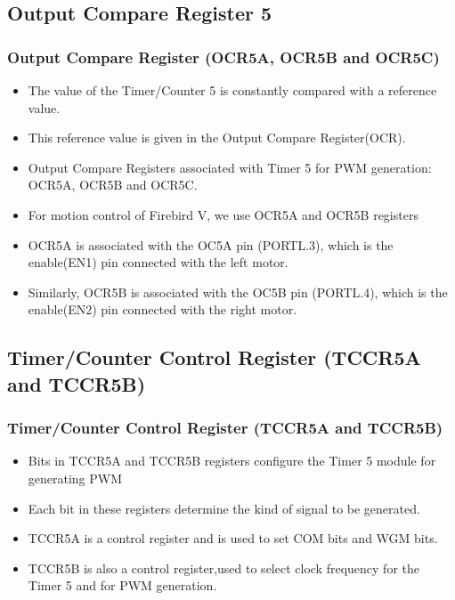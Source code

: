 \documentclass[table,10pt,red]{beamer}	%
\begin{document}
\subsection{Output Compare Register 5} 
\begin{frame}
	\frametitle{Output Compare Register (OCR5A, OCR5B and OCR5C)}
	\begin{itemize}
	  \item <+-|alert@+> The value of the Timer/Counter 5 is constantly compared with a reference value.
	  \item <+-|alert@+> This reference value is given in the Output Compare Register(OCR).
	  \item <+-|alert@+>Output Compare Registers associated with Timer 5 for PWM generation:
	  \pause
	  OCR5A, OCR5B and OCR5C.
	  \pause
	  \item <+-|alert@+> For motion control of Firebird V, we use OCR5A and OCR5B registers
	  \item <+-|alert@+> OCR5A is associated with the OC5A pin (PORTL.3), which is the enable(EN1) pin connected with the left motor.
	  \item <+-|alert@+> Similarly, OCR5B is associated with the OC5B pin (PORTL.4), which is the enable(EN2) pin connected with the right motor.
	 	  
	\end{itemize}
\end{frame}

\subsection{Timer/Counter Control Register (TCCR5A and TCCR5B)} %
\begin{frame}
\frametitle{Timer/Counter Control Register (TCCR5A and TCCR5B)}
\begin{itemize}
  \item <+-|alert@+> Bits in TCCR5A and TCCR5B registers configure the Timer 5 module for generating PWM
  \item <+-|alert@+> Each bit in these registers determine the kind of signal to be generated.
  \item <+-|alert@+> TCCR5A is a control register and is used to set COM bits and WGM bits.
  \item <+-|alert@+> TCCR5B is also a control register,used to select clock frequency for the Timer 5 and for PWM generation.   
\end{itemize}
\end{frame}
\end{document}
